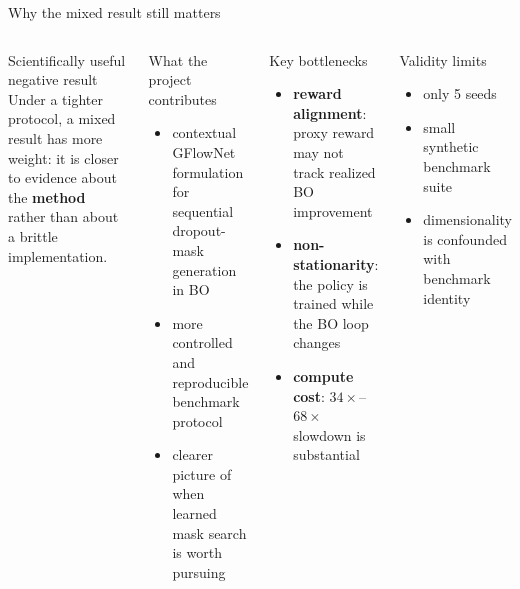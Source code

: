 \documentclass[aspectratio=169]{beamer}
\begin{document}
\begin{frame}{Why the mixed result still matters}
\vspace{-0.55em}
\begin{columns}[T,onlytextwidth]
\begin{minipage}[t][0.82\textheight]{\linewidth}\vspace{0pt}
  \begin{cardA}{Scientifically useful negative result}
  Under a tighter protocol, a mixed result has more weight: it is closer to evidence about the \textbf{method} rather than about a brittle implementation.
  \end{cardA}

  \vfill

  \begin{card}{What the project contributes}
  \begin{itemize}
    \item contextual GFlowNet formulation for sequential dropout-mask generation in BO
    \item more controlled and reproducible benchmark protocol
    \item clearer picture of when learned mask search is worth pursuing
  \end{itemize}
  \end{card}
\end{minipage}

\begin{minipage}[t][0.82\textheight]{\linewidth}\vspace{0pt}
  \begin{cardW}{Key bottlenecks}
  \begin{itemize}
    \item \textbf{reward alignment}: proxy reward may not track realized BO improvement
    \item \textbf{non-stationarity}: the policy is trained while the BO loop changes
    \item \textbf{compute cost}: $34\times$--$68\times$ slowdown is substantial
  \end{itemize}
  \end{cardW}

  \vfill

  \begin{card}{Validity limits}
  \begin{itemize}
    \item only 5 seeds
    \item small synthetic benchmark suite
    \item dimensionality is confounded with benchmark identity
  \end{itemize}
  \end{card}
\end{minipage}
\end{columns}
\end{frame}
\end{document}
